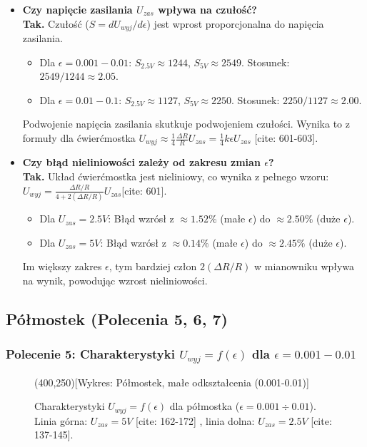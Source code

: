 \documentclass[12pt, a4paper]{article}
\begin{document}
	\begin{itemize}
		\item \textbf{Czy napięcie zasilania $U_{zas}$ wpływa na czułość?} \\
		\textbf{Tak.} Czułość ($S = dU_{wyj}/d\epsilon$) jest wprost proporcjonalna do napięcia zasilania.
		\begin{itemize}
			\item Dla $\epsilon=0.001-0.01$: $S_{2.5V} \approx 1244$, $S_{5V} \approx 2549$. Stosunek: $2549 / 1244 \approx 2.05$.
			\item Dla $\epsilon=0.01-0.1$: $S_{2.5V} \approx 1127$, $S_{5V} \approx 2250$. Stosunek: $2250 / 1127 \approx 2.00$.
		\end{itemize}
		Podwojenie napięcia zasilania skutkuje podwojeniem czułości.  Wynika to z formuły dla ćwierćmostka $U_{wyj} \approx \frac{1}{4} \frac{\Delta R}{R} U_{zas} = \frac{1}{4} k \epsilon U_{zas}$ [cite: 601-603].
		
		\item \textbf{Czy błąd nieliniowości zależy od zakresu zmian $\epsilon$?} \\
		 \textbf{Tak.} Układ ćwierćmostka jest nieliniowy, co wynika z pełnego wzoru: $U_{wyj} = \frac{\Delta R/R}{4+2(\Delta R/R)} U_{zas}$[cite: 601].
		\begin{itemize}
			\item Dla $U_{zas} = 2.5 V$: Błąd wzrósł z $\approx 1.52 \%$ (małe $\epsilon$) do $\approx 2.50 \%$ (duże $\epsilon$).
			\item Dla $U_{zas} = 5 V$: Błąd wzrósł z $\approx 0.14 \%$ (małe $\epsilon$) do $\approx 2.45 \%$ (duże $\epsilon$).
		\end{itemize}
		Im większy zakres $\epsilon$, tym bardziej człon $2(\Delta R/R)$ w mianowniku wpływa na wynik, powodując wzrost nieliniowości.
	\end{itemize}
	
	\subsection{Półmostek (Polecenia 5, 6, 7)}
	
	\subsubsection*{Polecenie 5: Charakterystyki $U_{wyj} = f(\epsilon)$ dla $\epsilon = 0.001-0.01$}
	
	\begin{figure}[H]
		\centering
		\framebox(400,250){[Wykres: Półmostek, małe odkształcenia (0.001-0.01)]}
		\caption{Charakterystyki $U_{wyj} = f(\epsilon)$ dla półmostka ($\epsilon = 0.001 \div 0.01$).  Linia górna: $U_{zas} = 5 V$ [cite: 162-172] , linia dolna: $U_{zas} = 2.5 V$ [cite: 137-145].}
	\end{figure}
	
\end{document}
